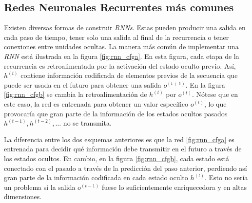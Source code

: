 \subsection{Redes Neuronales Recurrentes más comunes}

Existen diversas formas de construir \textit{RNNs}. Estas pueden producir una
salida en cada paso de tiempo, tener solo una salida al final de la recurrencia o tener
conexiones entre unidades ocultas.
La manera más común de implementar una \textit{RNN} está ilustrada en la
figura \ref{fig:rnn_cfga}. En esta figura, cada etapa de la recurrencia es retroalimentada por la
activación del estado oculto previo. Así, $h^{(t)}$ contiene información codificada de elementos
previos de la secuencia que puede ser usada en el futuro para obtener una salida $o^{(t+1)}$.
En la figura \ref{fig:rnn_cfgb} se
cambia la retroalimentación de $h^{(t)}$ por $o^{(t)}$. Nótese que en este caso, la red es entrenada
para obtener un valor específico $o^{(t)}$, lo que provocaría que gran parte de la información de
los estados ocultos pasados $h^{(t-1)}, h^{(t-2)}, \ldots$ no se transmita.

La diferencia entre los dos esquemas anteriores es que
la red \ref{fig:rnn_cfga} es entrenada para decidir qué información debe transmitir en el futuro a través
de los estados ocultos. En cambio, en la figura \ref{fig:rnn_cfgb}, cada estado está conectado con el
pasado a través de la predicción del paso anterior, perdiendo así gran parte de la información
codificada en cada estado oculto $h^{(t)}$. Esto no sería un problema si la salida $o^{(t-1)}$ fuese
lo suficientemente enriquecedora y en altas dimensiones.



